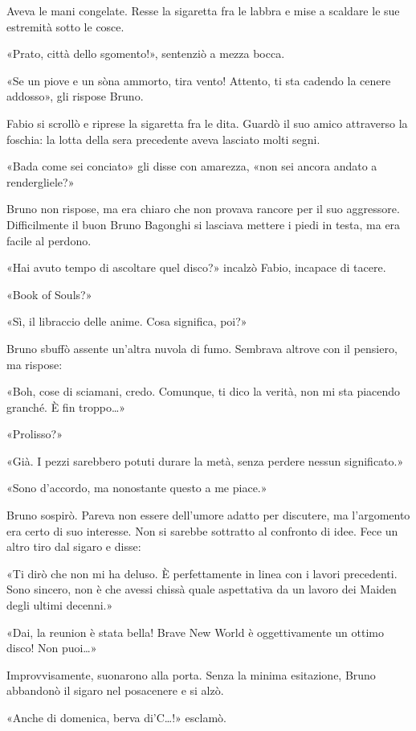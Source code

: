 Aveva le mani congelate. Resse la sigaretta fra le labbra e mise a scaldare le sue estremità sotto le cosce.

«Prato, città dello sgomento!», sentenziò a mezza bocca.

«Se \textsc{}un piove e \textsc{}un sòna ammorto, tira vento! Attento, ti sta cadendo la cenere addosso», gli rispose Bruno.

Fabio si scrollò e riprese la sigaretta fra le dita. Guardò il suo amico attraverso la foschia: la lotta della sera precedente aveva lasciato molti segni.

«Bada come sei conciato» gli disse con amarezza, «non sei ancora andato a rendergliele?»

Bruno non rispose, ma era chiaro che non provava rancore per il suo aggressore. Difficilmente il buon Bruno Bagonghi si lasciava mettere i piedi in testa, ma era facile al perdono.

«Hai avuto tempo di ascoltare quel disco?» incalzò Fabio, incapace di tacere.

«Book of Souls?»

«Sì, il libraccio delle anime. Cosa significa, poi?»

Bruno sbuffò assente un'altra nuvola di fumo. Sembrava altrove con il pensiero, ma rispose:

«Boh, cose di sciamani, credo. Comunque, ti dico la verità, non mi sta piacendo granché. È fin troppo\ldots»

«Prolisso?»

«Già. I pezzi sarebbero potuti durare la metà, senza perdere nessun significato.»

«Sono d'accordo, ma nonostante questo a me piace.»

Bruno sospirò. Pareva non essere dell'umore adatto per discutere, ma l'argomento era certo di suo interesse. Non si sarebbe sottratto al confronto di idee. Fece un altro tiro dal sigaro e disse:

«Ti dirò che non mi ha deluso. È perfettamente in linea con i lavori precedenti. Sono sincero, non è che avessi chissà quale aspettativa da un lavoro dei Maiden degli ultimi decenni.»

«Dai, la reunion è stata bella! Brave New World è oggettivamente un ottimo disco! Non puoi\ldots»

Improvvisamente, suonarono alla porta. Senza la minima esitazione, Bruno abbandonò il sigaro nel posacenere e si alzò.

«Anche di domenica, berva di'C\ldots!» esclamò.

